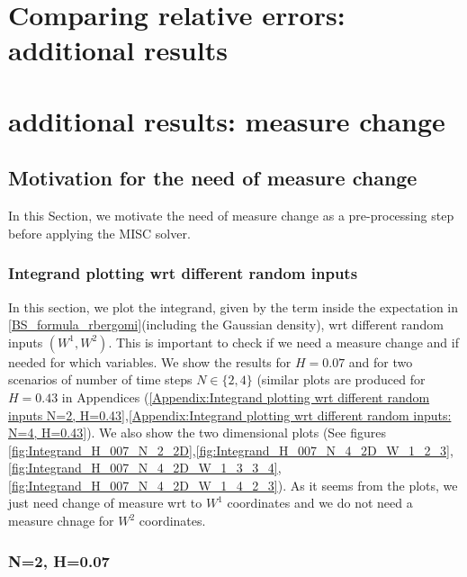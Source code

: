 \documentclass[11pt]{article}
\begin{document}
\newpage
\appendix
\section{Comparing relative errors: additional results}\label{Appendix:Comparing relative errors: additional results}



 

 \section{additional results: measure change}\label{appendix:additional results: measure change}
 
 \subsection{Motivation for the need of measure change}\label{sec:Motivation for the need of measure change}
 In this Section, we motivate the need of measure change as a pre-processing step before applying the MISC solver.
 \subsubsection{Integrand plotting wrt different random inputs } \label{sec:Integrand plotting wrt different random inputs}
 In this section, we plot the integrand, given by the term inside the expectation in \eqref{BS_formula_rbergomi}(including the Gaussian density), wrt different random inputs $(W^1,W^2)$. This is important to check if we need a measure change and if needed for which variables. We show the results for  $H=0.07$ and for two scenarios of number of time steps $N \in \{2,4\}$ (similar plots are produced for $H=0.43$ in Appendices (\ref{Appendix:Integrand plotting wrt different random inputs N=2, H=0.43},\ref{Appendix:Integrand plotting wrt different random inputs: N=4, H=0.43}). We also show the two dimensional plots (See figures \ref{fig:Integrand_H_007_N_2_2D},\ref{fig:Integrand_H_007_N_4_2D_W_1_2_3},\ref{fig:Integrand_H_007_N_4_2D_W_1_3_3_4},\ref{fig:Integrand_H_007_N_4_2D_W_1_4_2_3}). As it seems from the plots, we  just need change of measure wrt to $W^1$ coordinates and we do not need a measure chnage for $W^2$ coordinates. 
 
 
 
 \subsubsection*{N=2, H=0.07}
 
\end{document}
